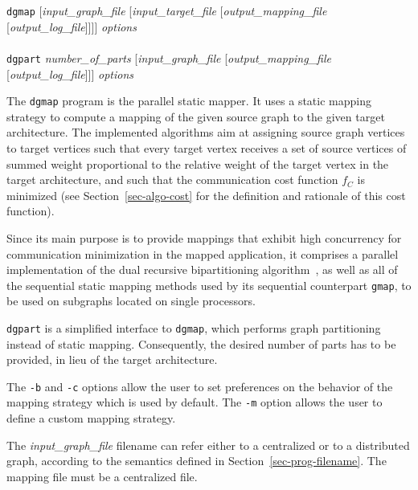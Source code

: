 \begin{itemize}
\progsyn
{\tt dgmap} [{\it input\_graph\_file} [{\it input\_\lbt target\_\lbt file} [{\it output\_\lbt mapping\_\lbt file} [{\it output\_\lbt log\_\lbt file}]]]] {\it options}\\
~\\
{\tt dgpart} {\it number\_\lbt of\_\lbt parts} [{\it input\_graph\_file} [{\it output\_\lbt mapping\_\lbt file} [{\it output\_\lbt log\_\lbt file}]]] {\it options}

\progdes

The {\tt dgmap} program is the parallel static mapper. It uses a
static mapping strategy to compute a mapping of the given source graph
to the given target architecture. The implemented algorithms aim at
assigning source graph vertices to target vertices such that every
target vertex receives a set of source vertices of summed weight
proportional to the relative weight of the target vertex in the target
architecture, and such that the communication cost function $f_C$ is
minimized (see Section~\ref{sec-algo-cost} for the definition and
rationale of this cost function).

Since its main purpose is to provide mappings that exhibit high
concurrency for communication minimization in the mapped application,
it comprises a parallel implementation of the dual recursive
bipartitioning algorithm~\cite{pell94a}, as well as all of the
sequential static mapping methods used by its sequential counterpart
{\tt gmap}, to be used on subgraphs located on single processors.

{\tt dgpart} is a simplified interface to {\tt dgmap}, which performs
graph partitioning instead of static mapping. Consequently, the
desired number of parts has to be provided, in lieu of the target
architecture.

The {\tt -b} and {\tt -c} options allow the user to set preferences on
the behavior of the mapping strategy which is used by default. The
{\tt -m} option allows the user to define a custom mapping strategy.

The {\it input\_graph\_file} filename can refer either to a
centralized or to a distributed graph, according to the semantics
defined in Section~\ref{sec-prog-filename}. The mapping file must be
a centralized file.


\end{itemize}
